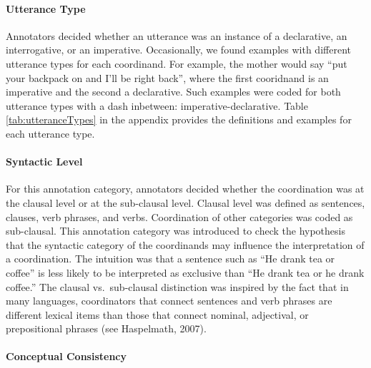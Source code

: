 \documentclass[floatsintext,man]{apa6}
\theoremstyle{definition}
\theoremstyle{definition}
\theoremstyle{definition}
\theoremstyle{remark}
\begin{document}
\paragraph{Utterance Type}\label{utterance-type}

Annotators decided whether an utterance was an instance of a
declarative, an interrogative, or an imperative. Occasionally, we found
examples with different utterance types for each coordinand. For
example, the mother would say \enquote{put your backpack on and I'll be
right back}, where the first cooridnand is an imperative and the second
a declarative. Such examples were coded for both utterance types with a
dash inbetween: imperative-declarative. Table \ref{tab:utteranceTypes}
in the appendix provides the definitions and examples for each utterance
type.

\paragraph{Syntactic Level}\label{syntactic-level}

For this annotation category, annotators decided whether the
coordination was at the clausal level or at the sub-clausal level.
Clausal level was defined as sentences, clauses, verb phrases, and
verbs. Coordination of other categories was coded as sub-clausal. This
annotation category was introduced to check the hypothesis that the
syntactic category of the coordinands may influence the interpretation
of a coordination. The intuition was that a sentence such as \enquote{He
drank tea or coffee} is less likely to be interpreted as exclusive than
\enquote{He drank tea or he drank coffee.} The clausal vs.~sub-clausal
distinction was inspired by the fact that in many languages,
coordinators that connect sentences and verb phrases are different
lexical items than those that connect nominal, adjectival, or
prepositional phrases (see Haspelmath, 2007).

\paragraph{Conceptual Consistency}\label{conceptual-consistency}
\end{document}
